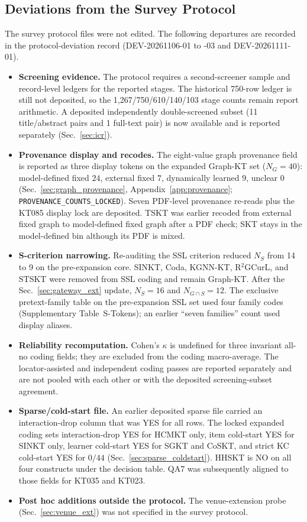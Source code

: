 \documentclass[lettersize,journal]{IEEEtran}
\begin{document}
\subsection{Deviations from the Survey Protocol}
\label{sec:deviations}
The survey protocol files were not edited. The following departures are recorded in the protocol-deviation record (DEV-20261106-01 to -03 and DEV-20261111-01).
\begin{itemize}
    \item \textbf{Screening evidence.} The protocol requires a second-screener sample and record-level ledgers for the reported stages. The historical 750-row ledger is still not deposited, so the 1{,}267/750/610/140/103 stage counts remain report arithmetic. A deposited independently double-screened subset (11 title/abstract pairs and 1 full-text pair) is now available and is reported separately (Sec.~\ref{sec:icr}).
    \item \textbf{Provenance display and recodes.} The eight-value graph provenance field is reported as three display tokens on the expanded Graph-KT set ($N_G=40$): model-defined fixed $24$, external fixed $7$, dynamically learned $9$, unclear $0$ (Sec.~\ref{sec:graph_provenance}, Appendix~\ref{app:provenance}; \texttt{PROVENANCE\_COUNTS\_LOCKED}). Seven PDF-level provenance re-reads plus the KT085 display lock are deposited. TSKT was earlier recoded from external fixed graph to model-defined fixed graph after a PDF check; SKT stays in the model-defined bin although its PDF is mixed.
    \item \textbf{S-criterion narrowing.} Re-auditing the SSL criterion reduced $N_S$ from 14 to 9 on the pre-expansion core. SINKT, Coda, KGNN-KT, R$^2$GCurL, and STSKT were removed from SSL coding and remain Graph-KT. After the Sec.~\ref{sec:gateway_ext} update, $N_S=16$ and $N_{G\cap S}=12$. The exclusive pretext-family table on the pre-expansion SSL set used four family codes (Supplementary Table~S-Tokens); an earlier ``seven families'' count used display aliases.
    \item \textbf{Reliability recomputation.} Cohen's $\kappa$ is undefined for three invariant all-no coding fields; they are excluded from the coding macro-average. The locator-assisted and independent coding passes are reported separately and are not pooled with each other or with the deposited screening-subset agreement.
    \item \textbf{Sparse/cold-start file.} An earlier deposited sparse file carried an interaction-drop column that was YES for all rows. The locked expanded coding sets interaction-drop YES for HCMKT only, item cold-start YES for SINKT only, learner cold-start YES for SGKT and CoSKT, and strict KC cold-start YES for $0/44$ (Sec.~\ref{sec:sparse_coldstart}). HHSKT is NO on all four constructs under the decision table. QA7 was subsequently aligned to those fields for KT035 and KT023.
    \item \textbf{Post hoc additions outside the protocol.} The venue-extension probe (Sec.~\ref{sec:venue_ext}) was not specified in the survey protocol.
\end{itemize}
\end{document}
